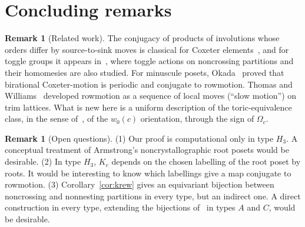 \documentclass[11pt]{amsart}
\theoremstyle{definition}
\newtheorem{remark}[theorem]{Remark}
\begin{document}
\section{Concluding remarks}\label{sec:remarks}

\begin{remark}[Related work]\label{rem:related}
The conjugacy of products of involutions whose orders differ by source-to-sink moves is classical for Coxeter elements~\cite{Shi,EE,MM}, and for toggle groups it appears in~\cite[\S3]{EFGJMPR}, where toggle actions on noncrossing partitions and their homomesies are also studied. For minuscule posets, Okada~\cite{Oka} proved that birational Coxeter-motion is periodic and conjugate to rowmotion. Thomas and Williams~\cite{TW} developed rowmotion as a sequence of local moves (``slow motion'') on trim lattices. What is new here is a uniform description of the toric-equivalence class, in the sense of~\cite{DMR}, of the $w_0(c)$ orientation, through the sign of $\Omega_c$.
\end{remark}

\begin{remark}[Open questions]
(1) Our proof is computational only in type $H_3$. A conceptual treatment of Armstrong's noncrystallographic root posets would be desirable. (2) In type $H_3$, $K_c$ depends on the chosen labelling of the root poset by roots. It would be interesting to know which labellings give a map conjugate to rowmotion. (3) Corollary~\ref{cor:krew} gives an equivariant bijection between noncrossing and nonnesting partitions in every type, but an indirect one. A direct construction in every type, extending the bijections of~\cite{DFISTW} in types $A$ and $C$, would be desirable.
\end{remark}
\end{document}
